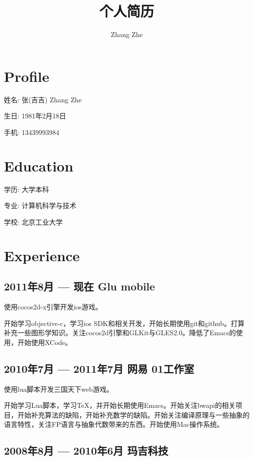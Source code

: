 \documentclass{article}
\begin{document}
\begin{CJK*}{UTF8}{gbsn}

\title{个人简历}
\author{Zhang Zhe}

\maketitle

\newpage

\section*{Profile}

姓名: 张(吉吉) Zhang Zhe

生日: 1981年2月18日

手机: 13439993984

\section*{Education}

学历: 大学本科

专业: 计算机科学与技术

学校: 北京工业大学

\section*{Experience}

\subsection*{2011年8月 --- 现在 \quad Glu mobile}

使用cocos2d-x引擎开发ios游戏。

开始学习objective-c，学习ios SDK和相关开发，开始长期使用git和github。打算补充一些图形学知识。关注cocos2d引擎和GLKit与GLES2.0。降低了Emacs的使用，开始使用XCode。

\subsection*{2010年7月 --- 2011年7月 \quad 网易 01工作室}

使用lua脚本开发三国天下web游戏。

开始学习Lua脚本，学习{\TeX}，并开始长期使用Emacs。开始关注bwapi的相关项目，开始补充算法的缺陷，开始补充数学的缺陷。开始关注编译原理与一些抽象的语言特性，关注FP语言与抽象代数带来的东西。开始使用Mac操作系统。

\subsection*{2008年8月 --- 2010年6月 \quad 玛吉科技}


\end{CJK*}
\end{document}
